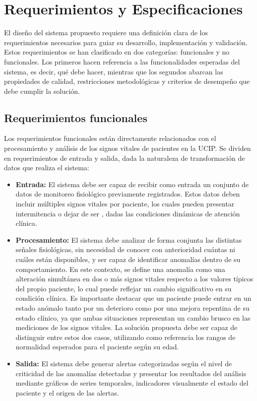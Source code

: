 \chapter{Requerimientos y Especificaciones}

El diseño del sistema propuesto requiere una definición clara de los requerimientos necesarios para guiar su desarrollo, implementación y validación. Estos requerimientos se han clasificado en dos categorías: funcionales y no funcionales. Los primeros hacen referencia a las funcionalidades esperadas del sistema, es decir, qué debe hacer, mientras que los segundos abarcan las propiedades de calidad, restricciones metodológicas y criterios de desempeño que debe cumplir la solución.

\section{Requerimientos funcionales}

Los requerimientos funcionales están directamente relacionados con el procesamiento y análisis de los signos vitales de pacientes en la UCIP. Se dividen en requerimientos de entrada y salida, dada la naturaleza de transformación de datos que realiza el sistema:

\begin{itemize}
  \item \textbf{Entrada:} El sistema debe ser capaz de recibir como entrada un conjunto de datos de monitoreo fisiológico previamente registrados. Estos datos deben incluir múltiples signos vitales por paciente, los cuales pueden presentar intermitencia o dejar de ser , dadas las condiciones dinámicas de atención clínica.

  \item \textbf{Procesamiento:} El sistema debe analizar de forma conjunta las distintas señales fisiológicas, sin necesidad de conocer con anterioridad cuántas ni cuáles están disponibles, y ser capaz de identificar anomalías dentro de su comportamiento. En este contexto, se define una anomalía como una alteración simultánea en dos o más signos vitales respecto a los valores típicos del propio paciente, lo cual puede reflejar un cambio significativo en su condición clínica. Es importante destacar que un paciente puede entrar en un estado anómalo tanto por un deterioro como por una mejora repentina de su estado clínico, ya que ambas situaciones representan un cambio brusco en las mediciones de los signos vitales. La solución propuesta debe ser capaz de distinguir entre estos dos casos, utilizando como referencia los rangos de normalidad esperados para el paciente según su edad.

  \item \textbf{Salida:} El sistema debe generar alertas categorizadas según el nivel de criticidad de las anomalías detectadas y presentar los resultados del análisis mediante gráficos de series temporales, indicadores visualmente el estado del paciente y el origen de las alertas.

\end{itemize}

